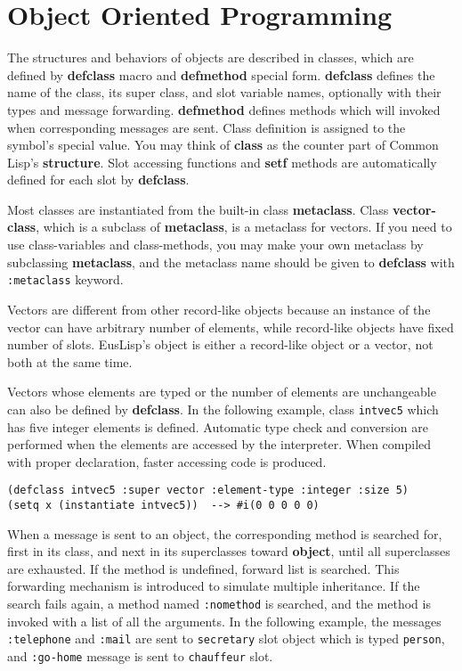 \section{Object Oriented Programming}

The structures and behaviors of objects are described in
classes, which are defined by
{\bf defclass} macro and {\bf defmethod} special form.
{\bf defclass} defines the name of the class, its super class, and
slot variable names, optionally with their types and message forwarding.
{\bf defmethod} defines methods which will invoked when
corresponding messages are sent.
Class definition is assigned to the symbol's special value.
You may think of {\bf class} as 
the counter part of Common Lisp's {\bf structure}.
Slot accessing functions and {\bf setf} methods are automatically defined
for each slot by {\bf defclass}.

Most classes are instantiated from the built-in class {\bf metaclass}.
Class {\bf vector-class}, which is a subclass of {\bf metaclass},
is a metaclass for vectors.
If you need to use class-variables and class-methods,
you may make your own metaclass by subclassing {\bf metaclass},
and the metaclass name should be given to {\bf defclass} with
{\tt :metaclass} keyword.

Vectors are different from other record-like objects
because an instance of the vector can have arbitrary number of elements,
while record-like objects have fixed number of slots.
EusLisp's object is either a record-like object or a vector, not both
at the same time.

Vectors whose elements are typed or the number of elements are
unchangeable can also be defined by {\bf defclass}.
In the following example,
class {\tt intvec5} which has five integer elements is defined.
Automatic type check and conversion are performed when the elements are
accessed by the interpreter.
When compiled with proper declaration, faster accessing code is produced.

\begin{verbatim}
(defclass intvec5 :super vector :element-type :integer :size 5)
(setq x (instantiate intvec5))  --> #i(0 0 0 0 0)
\end{verbatim}

When a message is sent to an object, 
the corresponding method is searched for, first in its class,
and next in its superclasses toward {\bf object},
until all superclasses are exhausted.
If the method is undefined, forward list is searched.
This forwarding mechanism is introduced to simulate multiple inheritance.
If the search fails again, a method named {\tt :nomethod} is searched,
and the method is invoked with a list of all the arguments.
In the following example, the messages {\tt :telephone} and {\tt :mail} are
sent to {\tt secretary} slot object which is typed {\tt person},
and {\tt :go-home} message is sent to {\tt chauffeur} slot.

